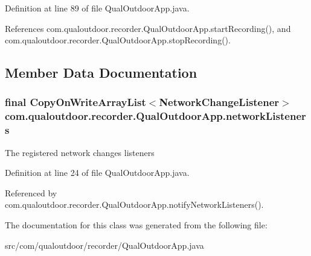 Definition at line 89 of file Qual\-Outdoor\-App.\-java.



References com.\-qualoutdoor.\-recorder.\-Qual\-Outdoor\-App.\-start\-Recording(), and com.\-qualoutdoor.\-recorder.\-Qual\-Outdoor\-App.\-stop\-Recording().



\subsection{Member Data Documentation}
\hypertarget{classcom_1_1qualoutdoor_1_1recorder_1_1QualOutdoorApp_a355e77531ef176519c95f6d179a97889}{
\subsubsection[{network\-Listeners}]{\setlength{\rightskip}{0pt plus 5cm}final Copy\-On\-Write\-Array\-List$<${\bf Network\-Change\-Listener}$>$ com.\-qualoutdoor.\-recorder.\-Qual\-Outdoor\-App.\-network\-Listeners\hspace{0.3cm}{\ttfamily [private]}}}\label{classcom_1_1qualoutdoor_1_1recorder_1_1QualOutdoorApp_a355e77531ef176519c95f6d179a97889}
The registered network changes listeners 

Definition at line 24 of file Qual\-Outdoor\-App.\-java.



Referenced by com.\-qualoutdoor.\-recorder.\-Qual\-Outdoor\-App.\-notify\-Network\-Listeners().



The documentation for this class was generated from the following file\-:\begin{DoxyCompactItemize}
\item 
src/com/qualoutdoor/recorder/Qual\-Outdoor\-App.\-java\end{DoxyCompactItemize}
